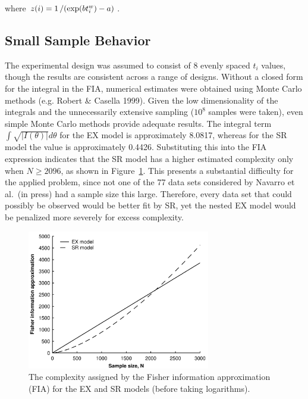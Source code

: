 \documentclass[doc,floatsintext]{apa6}
\begin{document}
\noindent
where $z(i)=1\left/ (\exp(bt_i^w) - a)\right.$.

\subsection*{Small Sample Behavior}

The experimental design was assumed to consist of 8 evenly spaced $t_i$ values, though the results are consistent across a range of designs. Without a closed form for the integral in the FIA, numerical estimates were obtained using Monte Carlo methods (e.g. Robert \& Casella 1999). Given the low dimensionality of the integrals and the unnecessarily extensive sampling ($10^8$ samples were taken), even simple Monte Carlo methods provide adequate results. The integral term $\int \sqrt{|I(\theta)|} d\theta$ for the EX model is approximately 8.0817, whereas for the SR model the value is approximately 0.4426. Substituting this into the FIA expression indicates that the SR model has a higher estimated complexity only when $N\geq 2096$, as shown in Figure~\ref{fia}. This presents a substantial difficulty for the applied problem, since not one of the 77 data sets considered by Navarro et al.\ (in press) had a sample size this large. Therefore, every data set that could possibly be observed would be better fit by SR, yet the nested EX model would be penalized more severely for excess complexity.

\begin{figure}\begin{center}
\includegraphics[width=8cm]{fia.png}
\caption{The complexity assigned by the Fisher information approximation (FIA) for the EX and SR models (before taking logarithms).}
\label{fia}
\end{center}\end{figure}
\end{document}
